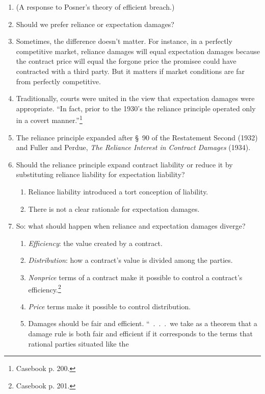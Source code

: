 \begin{enumerate}
    \item (A response to Posner's theory of efficient breach.)
    \item Should we prefer reliance or expectation damages?
    \item Sometimes, the difference doesn't matter. For instance, in a 
    perfectly competitive market, reliance damages will equal expectation 
    damages because the contract price will equal the forgone price the 
    promisee could have contracted with a third party. But it matters if 
    market conditions are far from perfectly competitive.
    \item Traditionally, courts were united in the view that expectation 
    damages were appropriate. ``In fact, prior to the 1930's the reliance 
    principle operated only in a covert manner.''\footnote{Casebook p. 200.}
    \item The reliance principle expanded after \S\ 90 of the Restatement 
    Second (1932) and Fuller and Perdue, \emph{The Reliance Interest in 
    Contract Damages} (1934).
    \item Should the reliance principle expand contract liability or reduce it 
    by substituting reliance liability for expectation liability?
    \begin{enumerate}
        \item Reliance liability introduced a tort conception of liability.
        \item There is not a clear rationale for expectation damages.
    \end{enumerate}
    \item So: what should happen when reliance and expectation damages 
    diverge?
    \begin{enumerate}
        \item \emph{Efficiency}: the value created by a contract.
        \item \emph{Distribution}: how a contract's value is divided among the 
        parties.
        \item \emph{Nonprice} terms of a contract make it possible to control 
        a contract's efficiency.\footnote{Casebook p. 201.}
        \item \emph{Price} terms make it possible to control distribution.
        \item Damages should be fair and efficient. ``~.~.~.~we take as a 
        theorem that a damage rule is both fair and efficient if it 
        corresponds to the terms that rational parties situated like the 

\end{enumerate}
\end{enumerate}
